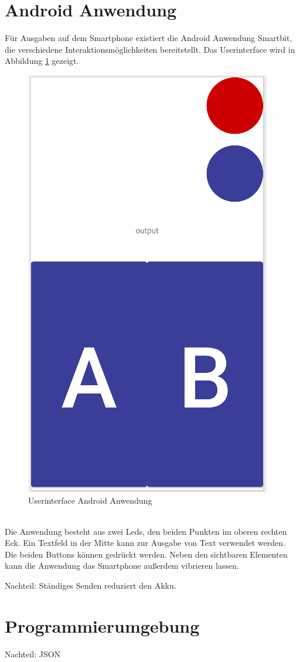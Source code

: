 \documentclass[11pt,a4paper]{report}
\begin{document}
\section{Android Anwendung}\label{sec:androidApp}
Für Ausgaben auf dem Smartphone existiert die Android Anwendung Smartbit, die verschiedene Interaktionsmöglichkeiten bereitstellt.
Das Userinterface wird in Abbildung \ref{fig:androidUI} gezeigt.
\begin{figure}[htbp]
  \centering
  \includegraphics[width=.6\textwidth]{images/android_app_ui}
  \caption{Userinterface Android Anwendung}
  \label{fig:androidUI}
\end{figure}
\\
Die Anwendung besteht aus zwei Leds, den beiden Punkten im oberen rechten Eck.
Ein Textfeld in der Mitte kann zur Ausgabe von Text verwendet werden.
Die beiden Buttons können gedrückt werden.
Neben den sichtbaren Elementen kann die Anwendung das Smartphone außerdem vibrieren lassen.

Nachteil: Ständiges Senden reduziert den Akku.

\section{Programmierumgebung}
Nachteil: JSON
\end{document}

